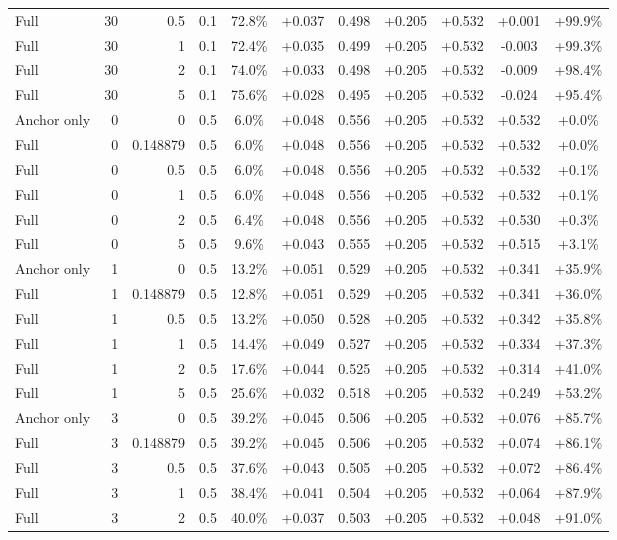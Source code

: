 \begin{table}[htbp]
\begin{tabular}{lrrrccccccc}
Full & 30 & 0.5 & 0.1 & 72.8\% & +0.037 & 0.498 & +0.205 & +0.532 & +0.001 & +99.9\% \\
Full & 30 & 1 & 0.1 & 72.4\% & +0.035 & 0.499 & +0.205 & +0.532 & -0.003 & +99.3\% \\
Full & 30 & 2 & 0.1 & 74.0\% & +0.033 & 0.498 & +0.205 & +0.532 & -0.009 & +98.4\% \\
Full & 30 & 5 & 0.1 & 75.6\% & +0.028 & 0.495 & +0.205 & +0.532 & -0.024 & +95.4\% \\
Anchor only & 0 & 0 & 0.5 & 6.0\% & +0.048 & 0.556 & +0.205 & +0.532 & +0.532 & +0.0\% \\
Full & 0 & 0.148879 & 0.5 & 6.0\% & +0.048 & 0.556 & +0.205 & +0.532 & +0.532 & +0.0\% \\
Full & 0 & 0.5 & 0.5 & 6.0\% & +0.048 & 0.556 & +0.205 & +0.532 & +0.532 & +0.1\% \\
Full & 0 & 1 & 0.5 & 6.0\% & +0.048 & 0.556 & +0.205 & +0.532 & +0.532 & +0.1\% \\
Full & 0 & 2 & 0.5 & 6.4\% & +0.048 & 0.556 & +0.205 & +0.532 & +0.530 & +0.3\% \\
Full & 0 & 5 & 0.5 & 9.6\% & +0.043 & 0.555 & +0.205 & +0.532 & +0.515 & +3.1\% \\
Anchor only & 1 & 0 & 0.5 & 13.2\% & +0.051 & 0.529 & +0.205 & +0.532 & +0.341 & +35.9\% \\
Full & 1 & 0.148879 & 0.5 & 12.8\% & +0.051 & 0.529 & +0.205 & +0.532 & +0.341 & +36.0\% \\
Full & 1 & 0.5 & 0.5 & 13.2\% & +0.050 & 0.528 & +0.205 & +0.532 & +0.342 & +35.8\% \\
Full & 1 & 1 & 0.5 & 14.4\% & +0.049 & 0.527 & +0.205 & +0.532 & +0.334 & +37.3\% \\
Full & 1 & 2 & 0.5 & 17.6\% & +0.044 & 0.525 & +0.205 & +0.532 & +0.314 & +41.0\% \\
Full & 1 & 5 & 0.5 & 25.6\% & +0.032 & 0.518 & +0.205 & +0.532 & +0.249 & +53.2\% \\
Anchor only & 3 & 0 & 0.5 & 39.2\% & +0.045 & 0.506 & +0.205 & +0.532 & +0.076 & +85.7\% \\
Full & 3 & 0.148879 & 0.5 & 39.2\% & +0.045 & 0.506 & +0.205 & +0.532 & +0.074 & +86.1\% \\
Full & 3 & 0.5 & 0.5 & 37.6\% & +0.043 & 0.505 & +0.205 & +0.532 & +0.072 & +86.4\% \\
Full & 3 & 1 & 0.5 & 38.4\% & +0.041 & 0.504 & +0.205 & +0.532 & +0.064 & +87.9\% \\
Full & 3 & 2 & 0.5 & 40.0\% & +0.037 & 0.503 & +0.205 & +0.532 & +0.048 & +91.0\% \\

\end{tabular}
\end{table}
